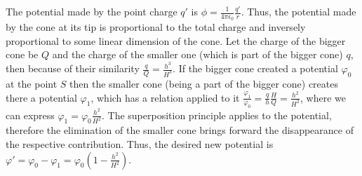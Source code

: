 {\ifEngSolution
The potential made by the point charge $q'$ is $\phi = \frac{1}{4 \pi \epsilon_0} \frac{q'}{r}$. Thus, the potential made by the cone at its tip is proportional to the total charge and inversely proportional to some linear dimension of the cone. Let the charge of the bigger cone be $Q$ and the charge of the smaller one (which is part of the bigger cone) $q$, then because of their similarity $\frac{q}{Q} = \frac{h^3}{H^3}$. If the bigger cone created a potential $\varphi_0$ at the point $S$ then the smaller cone (being a part of the bigger cone) creates there a potential $\varphi_1$, which has a relation applied to it $\frac{\varphi_1}{\varphi_0} = \frac{q}{h} \frac{H}{Q} = \frac{h^2}{H^2}$, where we can express $\varphi_1 = \varphi_0 \frac{h^2}{H^2}$. The superposition principle applies to the potential, therefore the elimination of the smaller cone brings forward the disappearance of the respective contribution. Thus, the desired new potential is $\varphi' = \varphi_0 - \varphi_1 = \varphi_0 ( 1 - \frac{h^2}{H^2})$.
\fi
}